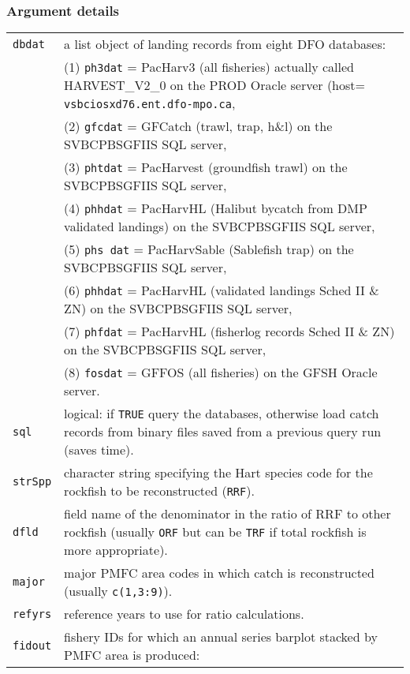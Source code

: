 \documentclass[letterpaper,12pt,fleqn]{article}
\newcommand{\code}[1]{\small\texttt{#1}\normalsize}
\newcommand{\db}[1]{\small\textmd{\textsf{#1}}\normalsize}
\begin{document}
\subsubsection {Argument details}
\begin{longtable}[1]{l>{\raggedright\arraybackslash}p{} }
  \code{dbdat}  &  a list object of landing records from eight DFO databases:\\
                &  (1) \code{ph3dat} = \db{PacHarv3} (all fisheries) actually called \db{HARVEST\_V2\_0} on the \db{PROD} Oracle server (host= \code{vsbciosxd76.ent.dfo-mpo.ca},\\
                &  (2) \code{gfcdat} = \db{GFCatch} (trawl, trap, h\&l) on the \db{SVBCPBSGFIIS} SQL server,\\
                &  (3) \code{phtdat} = \db{PacHarvest} (groundfish trawl) on the \db{SVBCPBSGFIIS} SQL server,\\
                &  (4) \code{phhdat} = \db{PacHarvHL} (Halibut bycatch from DMP validated landings) on the \db{SVBCPBSGFIIS} SQL server,\\
                &  (5) \code{phs dat} = \db{PacHarvSable} (Sablefish trap) on the \db{SVBCPBSGFIIS} SQL server,\\
                &  (6) \code{phhdat} = \db{PacHarvHL} (validated landings Sched II \& ZN) on the \db{SVBCPBSGFIIS} SQL server,\\
                &  (7) \code{phfdat} = \db{PacHarvHL} (fisherlog records Sched II \& ZN) on the \db{SVBCPBSGFIIS} SQL server,\\
                &  (8) \code{fosdat} = \db{GFFOS} (all fisheries) on the \db{GFSH} Oracle server.\\
  \code{sql}    &  logical: if \code{TRUE} query the databases, otherwise load catch records from binary files saved from a previous query run (saves time).\\
  \code{strSpp} &  character string specifying the Hart species code for the rockfish to be reconstructed (\code{RRF}).\\
  \code{dfld}   &  field name of the denominator in the ratio of RRF to other rockfish (usually \code{ORF} but can be \code{TRF} if total rockfish is more appropriate).\\
  \code{major}  &  major PMFC area codes in which catch is reconstructed (usually \code{c(1,3:9)}).\\
  \code{refyrs} &  reference years to use for ratio calculations.\\
  \code{fidout} &  fishery IDs for which an annual series barplot stacked by PMFC area is produced:\\

\end{longtable}
\end{document}
